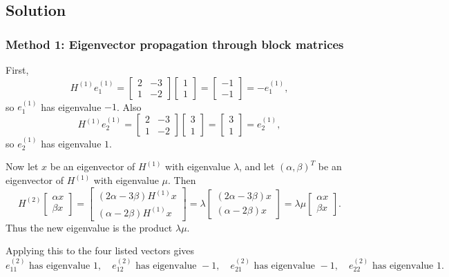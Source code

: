 \documentclass[12pt]{article}
\begin{document}
\subsection{Solution}

\subsubsection{Method 1: Eigenvector propagation through block matrices}
First,
\[
H^{(1)}e_1^{(1)}=\begin{bmatrix}2&-3\\1&-2\end{bmatrix}
\begin{bmatrix}1\\1\end{bmatrix}
=\begin{bmatrix}-1\\-1\end{bmatrix}=-e_1^{(1)},
\]
so $e_1^{(1)}$ has eigenvalue $-1$. Also
\[
H^{(1)}e_2^{(1)}=\begin{bmatrix}2&-3\\1&-2\end{bmatrix}
\begin{bmatrix}3\\1\end{bmatrix}
=\begin{bmatrix}3\\1\end{bmatrix}=e_2^{(1)},
\]
so $e_2^{(1)}$ has eigenvalue $1$.

Now let $x$ be an eigenvector of $H^{(1)}$ with eigenvalue $\lambda$, and let $(\alpha,\beta)^T$ be an eigenvector of $H^{(1)}$ with eigenvalue $\mu$. Then
\[
H^{(2)}\begin{bmatrix}\alpha x\\\beta x\end{bmatrix}
=\begin{bmatrix}(2\alpha-3\beta)H^{(1)}x\\(\alpha-2\beta)H^{(1)}x\end{bmatrix}
=\lambda\begin{bmatrix}(2\alpha-3\beta)x\\(\alpha-2\beta)x\end{bmatrix}
=\lambda\mu\begin{bmatrix}\alpha x\\\beta x\end{bmatrix}.
\]
Thus the new eigenvalue is the product $\lambda\mu$.

Applying this to the four listed vectors gives
\[
\boxed{e_{11}^{(2)}\text{ has eigenvalue }1,\quad
 e_{12}^{(2)}\text{ has eigenvalue }-1,\quad
 e_{21}^{(2)}\text{ has eigenvalue }-1,\quad
 e_{22}^{(2)}\text{ has eigenvalue }1.}
\]
\end{document}

